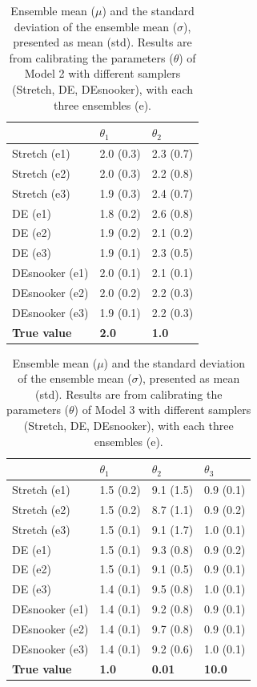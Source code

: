 \begin{table}[ht]
\caption{Ensemble mean ($\mu$) and the standard deviation of the ensemble mean ($\sigma$), presented as mean (std). Results are from calibrating the parameters ($\theta$) of Model 2 with different samplers (Stretch, DE, DEsnooker), with each three ensembles (e).}
\label{tab_logbook_1.2_mean2}
\begin{tabularx}{\textwidth}{XXX}
\toprule
 & $\theta_1$ & $\theta_2$ \\
\midrule
Stretch (e1) & 2.0 (0.3) & 2.3 (0.7) \\
Stretch (e2) & 2.0 (0.3) & 2.2 (0.8) \\
Stretch (e3) & 1.9 (0.3) & 2.4 (0.7) \\
\midrule
DE (e1) & 1.8 (0.2) & 2.6 (0.8) \\
DE (e2) & 1.9 (0.2) & 2.1 (0.2) \\
DE (e3) & 1.9 (0.1) & 2.3 (0.5) \\
\midrule
DEsnooker (e1) & 2.0 (0.1) & 2.1 (0.1) \\
DEsnooker (e2) & 2.0 (0.2) & 2.2 (0.3) \\
DEsnooker (e3) & 1.9 (0.1) & 2.2 (0.3) \\
\midrule
\textbf{True value} & \textbf{2.0} & \textbf{1.0} \\
\bottomrule
\end{tabularx}
\end{table}

\begin{table}[ht]
\caption{Ensemble mean ($\mu$) and the standard deviation of the ensemble mean ($\sigma$), presented as mean (std). Results are from calibrating the parameters ($\theta$) of Model 3 with different samplers (Stretch, DE, DEsnooker), with each three ensembles (e).}
\label{tab_logbook_1.2_mean3}
\begin{tabularx}{\textwidth}{XXXX}
\toprule
 & $\theta_1$ & $\theta_2$ & $\theta_3$ \\
\midrule
Stretch (e1) & 1.5 (0.2) & 9.1 (1.5) & 0.9 (0.1) \\
Stretch (e2) & 1.5 (0.2) & 8.7 (1.1) & 0.9 (0.2) \\
Stretch (e3) & 1.5 (0.1) & 9.1 (1.7) & 1.0 (0.1) \\
\midrule
DE (e1) & 1.5 (0.1) & 9.3 (0.8) & 0.9 (0.2) \\
DE (e2) & 1.5 (0.1) & 9.1 (0.5) & 0.9 (0.1) \\
DE (e3) & 1.4 (0.1) & 9.5 (0.8) & 1.0 (0.1) \\
\midrule
DEsnooker (e1) & 1.4 (0.1) & 9.2 (0.8) & 0.9 (0.1) \\
DEsnooker (e2) & 1.4 (0.1) & 9.7 (0.8) & 0.9 (0.1) \\
DEsnooker (e3) & 1.4 (0.1) & 9.2 (0.6) & 1.0 (0.1) \\
\midrule
\textbf{True value} & \textbf{1.0} & \textbf{0.01} & \textbf{10.0} \\
\bottomrule
\end{tabularx}
\end{table}

